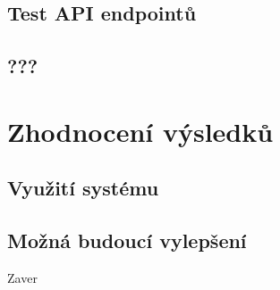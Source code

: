 \documentclass[thesis=B,czech]{FITthesis}[2012/06/26]
\begin{document}
\section{Test API endpointů}
\label{api-testing}
\section{???}

\chapter{Zhodnocení výsledků}
\label{zhodnoceni}
\section{Využití systému}
\section{Možná budoucí vylepšení}


\begin{conclusion}
	Zaver
\end{conclusion}
\end{document}

